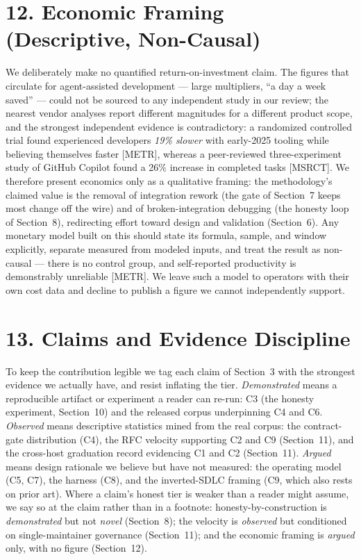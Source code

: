 \documentclass[11pt]{article}
\begin{document}
\section*{12. Economic Framing (Descriptive, Non-Causal)}
We deliberately make no quantified return-on-investment claim. The figures that circulate for
agent-assisted development --- large multipliers, ``a day a week saved'' --- could not be sourced to
any independent study in our review; the nearest vendor analyses report different magnitudes for a
different product scope, and the strongest independent evidence is contradictory: a randomized
controlled trial found experienced developers \emph{19\% slower} with early-2025 tooling while
believing themselves faster [METR], whereas a peer-reviewed three-experiment study of GitHub Copilot
found a 26\% increase in completed tasks [MSRCT]. We therefore present economics only as a qualitative
framing: the methodology's claimed value is the removal of integration rework (the gate of Section~7
keeps most change off the wire) and of broken-integration debugging (the honesty loop of Section~8),
redirecting effort toward design and validation (Section~6). Any monetary model built on this should
state its formula, sample, and window explicitly, separate measured from modeled inputs, and treat the
result as non-causal --- there is no control group, and self-reported productivity is demonstrably
unreliable [METR]. We leave such a model to operators with their own cost data and decline to publish a
figure we cannot independently support.

\section*{13. Claims and Evidence Discipline}
To keep the contribution legible we tag each claim of Section~3 with the strongest evidence we actually
have, and resist inflating the tier. \emph{Demonstrated} means a reproducible artifact or experiment a
reader can re-run: C3 (the honesty experiment, Section~10) and the released corpus underpinning C4 and
C6. \emph{Observed} means descriptive statistics mined from the real corpus: the contract-gate
distribution (C4), the RFC velocity supporting C2 and C9 (Section~11), and the cross-host graduation
record evidencing C1 and C2 (Section~11). \emph{Argued} means design rationale we believe but have not
measured: the operating model (C5, C7), the harness (C8), and the inverted-SDLC framing (C9, which also
rests on prior art). Where a claim's honest tier is weaker than a reader might assume, we say so at the
claim rather than in a footnote: honesty-by-construction is \emph{demonstrated} but not \emph{novel}
(Section~8); the velocity is \emph{observed} but conditioned on single-maintainer governance
(Section~11); and the economic framing is \emph{argued} only, with no figure (Section~12).
\end{document}
